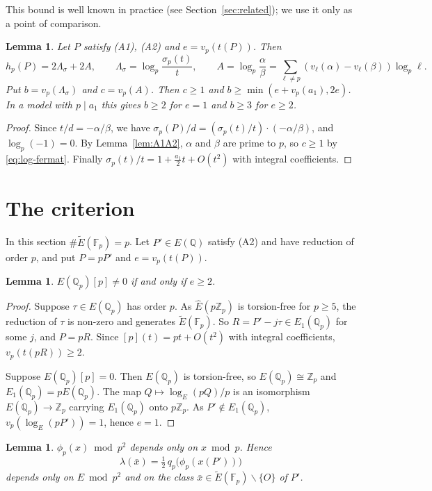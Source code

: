 \documentclass[11pt,a4paper]{amsart}
\newcommand{\Q}{\mathbb{Q}}
\newcommand{\Qp}{\mathbb{Q}_p}
\newcommand{\Zp}{\mathbb{Z}_p}
\newcommand{\Fp}{\mathbb{F}_p}
\newcommand{\Et}{\widetilde{E}}
\newcommand{\qp}{q_p}
\theoremstyle{plain}
\newtheorem{lemma}[theorem]{Lemma}
\theoremstyle{definition}
\theoremstyle{remark}
\begin{document}
This bound is well known in practice (see Section~\ref{sec:related}); we use it only as a point of comparison.

\begin{lemma}\label{lem:decomp}
Let $P$ satisfy \textup{(A1)}, \textup{(A2)} and $e=v_p(t(P))$. Then
\[
h_p(P)=2\Lambda_\sigma+2A,\qquad \Lambda_\sigma=\log_p\frac{\sigma_p(t)}{t},\qquad A=\log_p\frac{\alpha}{\beta}=\sum_{\ell\ne p}(v_\ell(\alpha)-v_\ell(\beta))\log_p\ell .
\]
Put $b=v_p(\Lambda_\sigma)$ and $c=v_p(A)$. Then $c\ge1$ and $b\ge\min(e+v_p(a_1),2e)$. In a model with $p\mid a_1$ this gives $b\ge2$ for $e=1$ and $b\ge3$ for $e\ge2$.
\end{lemma}

\begin{proof}
Since $t/d=-\alpha/\beta$, we have $\sigma_p(P)/d=(\sigma_p(t)/t)\cdot(-\alpha/\beta)$, and $\log_p(-1)=0$. By Lemma~\ref{lem:A1A2}, $\alpha$ and $\beta$ are prime to $p$, so $c\ge1$ by \eqref{eq:log-fermat}. Finally $\sigma_p(t)/t=1+\frac{a_1}2t+O(t^2)$ with integral coefficients.
\end{proof}

\section{The criterion}\label{sec:criterion}

In this section $\#\Et(\Fp)=p$. Let $P'\in E(\Q)$ satisfy \textup{(A2)} and have reduction of order $p$, and put $P=pP'$ and $e=v_p(t(P))$.

\begin{lemma}\label{lem:depth}
$E(\Qp)[p]\ne0$ if and only if $e\ge2$.
\end{lemma}

\begin{proof}
Suppose $\tau\in E(\Qp)$ has order $p$. As $\widehat E(p\Zp)$ is torsion-free for $p\ge5$, the reduction of $\tau$ is non-zero and generates $\Et(\Fp)$. So $R=P'-j\tau\in E_1(\Qp)$ for some $j$, and $P=pR$. Since $[p](t)=pt+O(t^2)$ with integral coefficients, $v_p(t(pR))\ge2$.

Suppose $E(\Qp)[p]=0$. Then $E(\Qp)$ is torsion-free, so $E(\Qp)\cong\Zp$ and $E_1(\Qp)=pE(\Qp)$. The map $Q\mapsto\log_E(pQ)/p$ is an isomorphism $E(\Qp)\to\Zp$ carrying $E_1(\Qp)$ onto $p\Zp$. As $P'\notin E_1(\Qp)$, $v_p(\log_E(pP'))=1$, hence $e=1$.
\end{proof}

\begin{lemma}\label{lem:lambda-local}
$\phi_p(x)\bmod p^2$ depends only on $x\bmod p$. Hence
\[
\lambda(\bar x)=\tfrac12\,\qp\bigl(\phi_p(x(P'))\bigr)
\]
depends only on $E\bmod p^2$ and on the class $\bar x\in\Et(\Fp)\smallsetminus\{O\}$ of $P'$.
\end{lemma}
\end{document}
